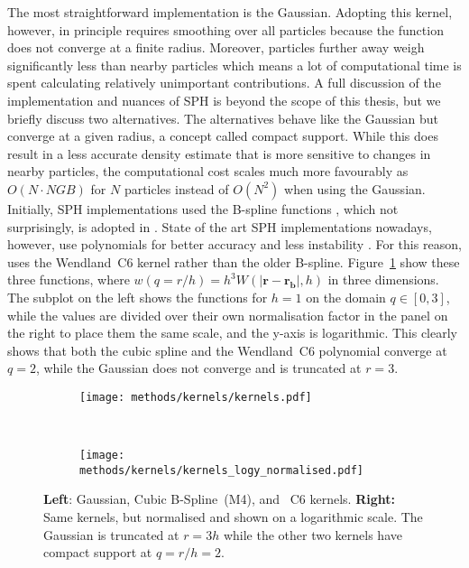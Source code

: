 \documentclass[MScProj_TLRH_ClusterEnergy.tex]{subfiles}
\begin{document}
The most straightforward implementation is the Gaussian. Adopting this kernel, 
however, in principle requires smoothing over all particles because the function 
does not converge at a finite radius. Moreover, particles further away weigh 
significantly less than nearby particles which means a lot of computational time
is spent calculating relatively unimportant contributions. A full discussion of
the implementation and nuances of SPH is beyond the scope of this thesis, but we 
briefly discuss two alternatives. The alternatives behave like the Gaussian
but converge at a given radius, a concept called compact support. While
this does result in a less accurate density estimate that is more sensitive
to changes in nearby particles, the computational cost 
scales much more favourably as $O(N \cdot NGB)$ for $N$ particles instead of 
$O(N^2)$ when using the Gaussian. Initially, SPH implementations used the 
\citet{SchoenbergBSpline} B-spline functions 
\citep{1985JCoPh..60..253M, 1985A&A...149..135M}, which not surprisingly,
is adopted in . State of the art SPH implementations
nowadays, however, use \citet{wendland1995piecewise, wendland2004scattered} 
polynomials for better accuracy and less instability \citep{2012MNRAS.425.1068D}.
For this reason,  uses the Wendland~C6 kernel rather than the 
older B-spline. Figure~\ref{fig:kernels} show these three functions, where 
$w(q=r/h) = h^3 W(|\mathbf{r}-\mathbf{r_b}|, h)$ in three dimensions.
The subplot on the left shows the functions for $h=1$ on the domain $q \in [0, 3]$,
while the values are divided over their own normalisation factor in the panel 
on the right to place them the same scale, and the y-axis is logarithmic. This 
clearly shows that both the cubic spline and the Wendland~C6 polynomial converge 
at $q=2$, while the Gaussian does not converge and is truncated at $r=3$.

\begin{figure}[ht]
  \centering
  \begin{subfigure}[b]{0.5\textwidth}
    \centering
    \texttt{[image: methods/kernels/kernels.pdf]}
  \end{subfigure}%
  ~
  \begin{subfigure}[b]{0.5\textwidth}
    \centering
    \texttt{[image: methods/kernels/kernels\_logy\_normalised.pdf]}
    \end{subfigure}
    \caption{\textbf{Left}: Gaussian, \citet{SchoenbergBSpline} Cubic B-Spline~(M4),
             and \citet{wendland1995piecewise}~C6 kernels.
             \newline
             \textbf{Right:} Same kernels, but normalised and shown on a logarithmic
             scale. The Gaussian is truncated at $r=3h$ while the other two kernels
             have compact support at $q=r/h=2$.}
    \label{fig:kernels}
\end{figure}
\end{document}
